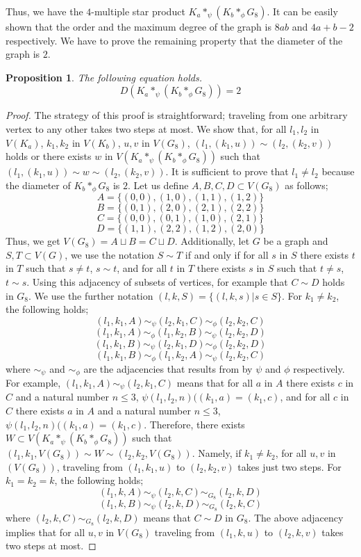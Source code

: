 \documentclass[conference]{IEEEtran}
\newtheorem*{Prop}{Proposition}
\begin{document}
Thus, we have the $4$-multiple star product $K_a *_\psi (K_b *_\phi G_8)$.
It can be easily shown that the order and the maximum degree of the graph is $8ab$ and $4a+b-2$ respectively.
We have to prove the remaining property that the diameter of the graph is $2$.
\begin{Prop}
The following equation holds.
\[ D( K_a *_\psi (K_b *_\phi G_8) ) = 2 \]
\end{Prop}
\begin{proof}
The strategy of this proof is straightforward;
traveling from one arbitrary vertex to any other takes two steps at most.
We show that, for all $l_1, l_2$ in $V(K_a)$, $k_1, k_2$ in $V(K_b)$, $u, v$ in $V(G_8)$,
$(l_1,(k_1,u)) \sim (l_2,(k_2, v))$ holds or there exists $w$ in $V(K_a *_\psi (K_b *_\phi G_8))$ such that $(l_1,(k_1,u)) \sim w \sim (l_2,(k_2, v))$.
It is sufficient to prove that $l_1 \neq l_2$ because the diameter of $K_b *_\phi G_8$ is $2$.
Let us define $A, B, C, D \subset V(G_8)$ as follows;
\[A=\{(0,0),(1,0),(1,1),(1,2)\}\]
\[B=\{(0,1),(2,0),(2,1),(2,2)\}\]
\[C=\{(0,0),(0,1),(1,0),(2,1)\}\]
\[D=\{(1,1),(2,2),(1,2),(2,0)\}\]
Thus, we get $V(G_8) = A \sqcup B = C \sqcup D$.
Additionally, let $G$ be a graph and $S, T \subset V(G)$, we use the notation $S \sim T$
if and only if for all $s$ in $S$ there exists $t$ in $T$ such that $s \neq t$, $s\sim t$, and
for all $t$ in $T$ there exists $s$ in $S$ such that $t \neq s$, $t \sim s$.
Using this adjacency of subsets of vertices, for example that $C \sim D$ holds in $G_8$.
We use the further notation $(l, k, S) = \{ (l, k, s) | s \in S\}$.
For $k_1 \neq k_2$, the following holds;
\[ (l_1,k_1,A) \sim_\psi (l_2,k_1,C) \sim_\phi (l_2,k_2,C) \]
\[ (l_1,k_1,A) \sim_\phi (l_1,k_2,B) \sim_\psi (l_2,k_2,D) \]
\[ (l_1,k_1,B) \sim_\psi (l_2,k_1,D) \sim_\phi (l_2,k_2,D) \]
\[ (l_1,k_1,B) \sim_\phi (l_1,k_2,A) \sim_\psi (l_2,k_2,C) \]
where $\sim_\psi$ and $\sim_\phi$ are the adjacencies that results from by $\psi$ and $\phi$ respectively.
For example, $(l_1,k_1,A) \sim_\psi (l_2,k_1,C)$ means that
for all $a$ in $A$ there exists $c$ in $C$ and a natural number $n \leq 3$, $\psi(l_1, l_2, n)((k_1,a)=(k_1,c)$,
and for all $c$ in $C$ there exists $a$ in $A$ and a natural number $n \leq 3$, $\psi(l_1, l_2, n)((k_1,a)=(k_1,c)$.
Therefore, there exists $W \subset V(K_a *_\psi (K_b *_\phi G_8))$
such that $(l_1,k_1,V(G_8)) \sim W \sim (l_2,k_2,V(G_8))$.
Namely, if $k_1 \neq k_2$, for all $u, v$ in $(V(G_8))$, traveling from $(l_1,k_1,u)$ to $(l_2,k_2,v)$ takes just two steps.
For $k_1 = k_2 = k$, the following holds;
\[ (l_1,k,A) \sim_\psi (l_2,k,C) \sim_{G_8} (l_2,k,D) \]
\[ (l_1,k,B) \sim_\psi (l_2,k,D) \sim_{G_8} (l_2,k,C) \]
where $(l_2,k,C) \sim_{G_8} (l_2,k,D)$ means that $C \sim D$ in $G_8$.
The above adjacency implies that
for all $u, v$ in $V(G_8)$ traveling from $(l_1,k,u)$ to $(l_2,k,v)$ takes two steps at most.
\end{proof}
\end{document}
